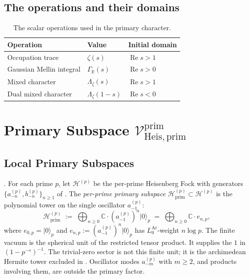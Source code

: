 \subsection{The operations and their domains}
\label{v4-arith:prim-zeta:table-summary}
\begin{table}[h]
\centering
\begin{tabular}{lll}
Operation & Value & Initial domain\\
\hline
Occupation trace & \(\zeta(s)\) & \(\operatorname{Re}s>1\)\\
Gaussian Mellin integral & \(\Gamma_{\mathbb R}(s)\) & \(\operatorname{Re}s>0\)\\
Mixed character & \(\Lambda_\zeta(s)\) & \(\operatorname{Re}s>1\)\\
Dual mixed character & \(\Lambda_\zeta(1-s)\) & \(\operatorname{Re}s<0\)
\end{tabular}
\caption{The scalar operations used in the primary character.}
\label{v4-arith:prim-zeta:tab:table}
\end{table}

\section{Primary Subspace
\texorpdfstring{\(\mathcal{V}^{\mathrm{prim}}_{\mathrm{Heis},\mathrm{prim}}\)}{V\^{}prim\_{Heis,prim}}}
\label{v4-arith:prim-zeta:primary-subspace}

\subsection{Local Primary Subspaces}
\label{v4-arith:prim-zeta:local-primary}

\begin{definition}
\label{v4-arith:prim-zeta:def:p-primary}
\ClaimStatusDefinitional. For each prime \(p\), let
\(\mathcal{H}^{(p)}\) be the per-prime Heisenberg Fock with generators
\(\{a^{(p)}_{-n},b^{(p)}_{-n}\}_{n\geq 1}\) of
. The \emph{per-prime primary
subspace}
\(\mathcal{H}^{(p)}_{\mathrm{prim}}\subset\mathcal{H}^{(p)}\) is
the polynomial tower on the single oscillator \(a^{(p)}_{-1}\):
\begin{equation}
\label{v4-arith:prim-zeta:eq:p-primary}
\mathcal{H}^{(p)}_{\mathrm{prim}}\;:=\;
\bigoplus_{n\geq 0}\mathbb{C}\cdot (a^{(p)}_{-1})^{n}|0\rangle_{p}
\;=\;\bigoplus_{n\geq 0}\mathbb{C}\cdot e_{n,p},
\end{equation}
where \(e_{0,p}=|0\rangle_{p}\) and
\(e_{n,p}:=(a^{(p)}_{-1})^{n}|0\rangle_{p}\) has
\(L_{0}^{\mathrm{Ar}}\)-weight \(n\log p\). The finite vacuum is the
spherical unit of the restricted tensor product. It supplies the
\(1\) in \((1-p^{-s})^{-1}\). The trivial-zero sector is not this
finite unit; it is the archimedean Hermite tower excluded in
. Oscillator modes
\(a^{(p)}_{-m}\) with \(m\geq2\), and products involving them, are
outside the primary factor.
\end{definition}

